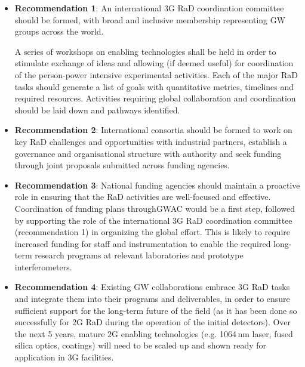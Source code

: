\begin{itemize}
\item \textbf{Recommendation 1}:  An international \ac{3G} \ac{RaD} coordination committee should be formed, with broad and inclusive membership representing \ac{GW} groups across the world.

 A series of workshops on enabling technologies shall be held in order to stimulate exchange of ideas and allowing (if deemed useful) for coordination of the person-power intensive experimental activities.  Each of the major \ac{RaD} tasks should generate a list of  goals with quantitative metrics,  timelines and required resources.   Activities requiring global collaboration and coordination should be laid down and pathways identified.

\item \textbf{Recommendation 2}:  International consortia should be formed to work on key \ac{RaD} challenges and opportunities with industrial partners, establish a governance and organisational structure with authority and seek funding through joint proposals submitted across funding agencies.

\item \textbf{Recommendation 3}: 
National funding agencies should maintain a proactive role in ensuring that the \ac{RaD} activities are well-focused and effective.  Coordination of funding plans through\ac{GWAC} would be a first step, followed by supporting the role of the international \ac{3G} \ac{RaD} coordination committee (recommendation 1) in organizing the global effort.  This is likely to require increased funding for staff and instrumentation to enable the required long-term research programs at relevant laboratories and prototype interferometers.

\item \textbf{Recommendation 4}: Existing \ac{GW} collaborations embrace \ac{3G} \ac{RaD} tasks and integrate them into their programs and deliverables, in order to ensure sufficient support for the long-term future of the field (as it has been done so successfully for \ac{2G} \ac{RaD} during the operation of the initial detectors). Over the next 5 years, mature \ac{2G} enabling technologies (e.g. 1064\,nm laser, fused silica optics, coatings) will need to be scaled up and shown ready for application in \ac{3G} facilities.
\end{itemize}


